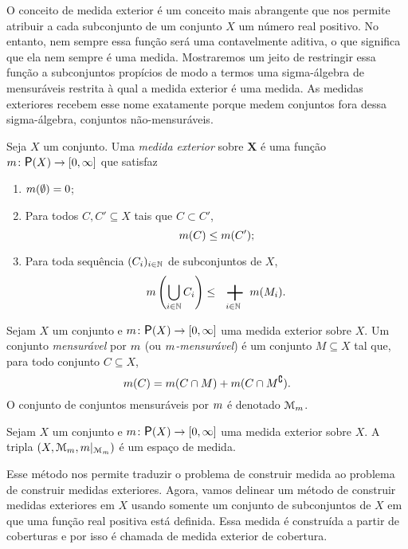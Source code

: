 O conceito de medida exterior é um conceito mais abrangente que nos permite atribuir a cada subconjunto de um conjunto $X$ um número real positivo. No entanto, nem sempre essa função será uma contavelmente aditiva, o que significa que ela nem sempre é uma medida. Mostraremos um jeito de restringir essa função a subconjuntos propícios de modo a termos uma sigma-álgebra de mensuráveis restrita à qual a medida exterior é uma medida. As medidas exteriores recebem esse nome exatamente porque medem conjuntos fora dessa sigma-álgebra, conjuntos não-mensuráveis.

\begin{definition}
Seja $X$ um conjunto. Uma \emph{medida exterior} sobre $\bm X$ é uma função $\med\colon \p(X) \to \intff{0}{\infty}$ que satisfaz
	\begin{enumerate}
	\item $m(\emptyset)=0$;
	\item Para todos $C,C' \subseteq X$ tais que $C \subset C'$,
		\begin{equation*}
		m(C) \leq m(C');
		\end{equation*}
	\item Para toda sequência $(C_i)_{i \in \mathbb{N}}$ de subconjuntos de $X$,
	\begin{equation*}
	\med\left(\bigcup_{i \in \N} C_i\right) \leq \sum_{i \in \N} \med(M_i).
	\end{equation*}
	\end{enumerate}
\end{definition}

\begin{definition}
Sejam $X$ um conjunto e $\med\colon \p(X) \to \intff{0}{\infty}$ uma medida exterior sobre $X$. Um conjunto \emph{mensurável} por $m$ (ou \emph{$m$-mensurável}) é um conjunto $M \subseteq X$ tal que, para todo conjunto $C \subseteq X$,
	\begin{equation*}
	m(C) = m(C \cap M) + m(C \cap M^\complement).
	\end{equation*}
O conjunto de conjuntos mensuráveis por $m$ é denotado $\mathcal{M}_m$.
\end{definition}

\begin{proposition}
Sejam $X$ um conjunto e $\med\colon \p(X) \to \intff{0}{\infty}$ uma medida exterior sobre $X$. A tripla $(X,\mathcal{M}_m,m|_{\mathcal{M}_m})$ é um espaço de medida.
\end{proposition}

Esse método nos permite traduzir o problema de construir medida ao problema de construir medidas exteriores. Agora, vamos delinear um método de construir medidas exteriores em $X$ usando somente um conjunto de subconjuntos de $X$ em que uma função real positiva está definida. Essa medida é construída a partir de coberturas e por isso é chamada de medida exterior de cobertura.

